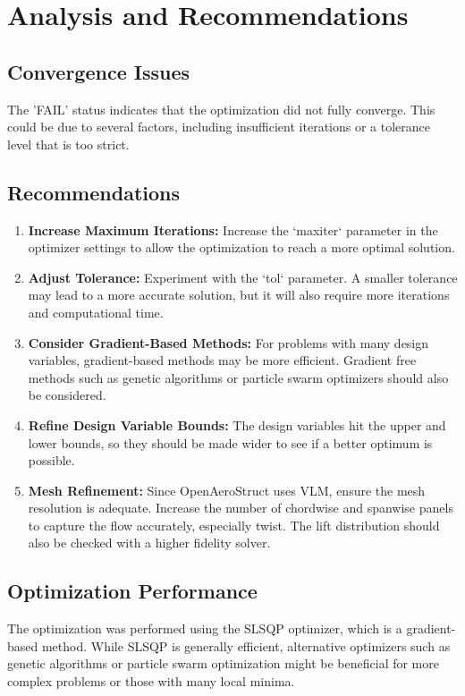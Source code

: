 \documentclass{article}
\begin{document}
\section{Analysis and Recommendations}
\subsection{Convergence Issues}
The 'FAIL' status indicates that the optimization did not fully converge. This could be due to several factors, including insufficient iterations or a tolerance level that is too strict. 

\subsection{Recommendations}
\begin{enumerate}
    	\item \textbf{Increase Maximum Iterations:} Increase the `maxiter` parameter in the optimizer settings to allow the optimization to reach a more optimal solution.
    	\item \textbf{Adjust Tolerance:} Experiment with the `tol` parameter. A smaller tolerance may lead to a more accurate solution, but it will also require more iterations and computational time.
    	\item \textbf{Consider Gradient-Based Methods:} For problems with many design variables, gradient-based methods may be more efficient. Gradient free methods such as genetic algorithms or particle swarm optimizers should also be considered.
    \item \textbf{Refine Design Variable Bounds:} The design variables hit the upper and lower bounds, so they should be made wider to see if a better optimum is possible.
    \item \textbf{Mesh Refinement:} Since OpenAeroStruct uses VLM, ensure the mesh resolution is adequate. Increase the number of chordwise and spanwise panels to capture the flow accurately, especially twist. The lift distribution should also be checked with a higher fidelity solver.
\end{enumerate}

\subsection{Optimization Performance}
The optimization was performed using the SLSQP optimizer, which is a gradient-based method. While SLSQP is generally efficient, alternative optimizers such as genetic algorithms or particle swarm optimization might be beneficial for more complex problems or those with many local minima.  
\end{document}

